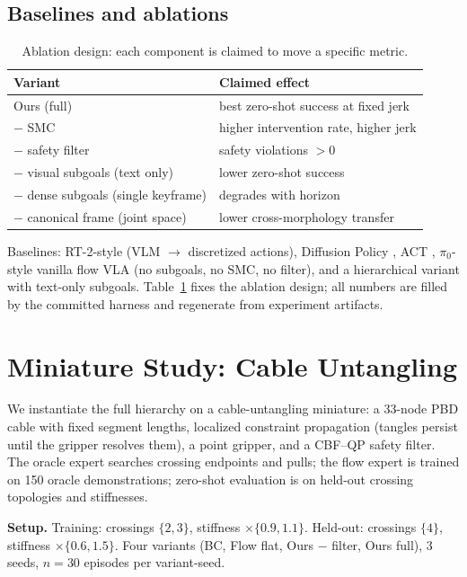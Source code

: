 \documentclass[conference,10pt]{IEEEtran}
\begin{document}
\subsection{Baselines and ablations}
\begin{table}[t]
\centering
\caption{Ablation design: each component is claimed to move a specific metric.}
\label{tab:abl}
\begin{tabular}{@{}ll@{}}
\toprule
Variant & Claimed effect \\
\midrule
Ours (full) & best zero-shot success at fixed jerk \\
$-$ SMC & higher intervention rate, higher jerk \\
$-$ safety filter & safety violations $> 0$ \\
$-$ visual subgoals (text only) & lower zero-shot success \\
$-$ dense subgoals (single keyframe) & degrades with horizon \\
$-$ canonical frame (joint space) & lower cross-morphology transfer \\
\bottomrule
\end{tabular}
\end{table}
Baselines: RT-2-style (VLM $\to$ discretized actions), Diffusion Policy \cite{diffusionpolicy}, ACT \cite{act}, $\pi_0$-style vanilla flow VLA (no subgoals, no SMC, no filter), and a hierarchical variant with text-only subgoals. Table~\ref{tab:abl} fixes the ablation design; all numbers are filled by the committed harness and regenerate from experiment artifacts.

\section{Miniature Study: Cable Untangling}
\label{sec:results}
We instantiate the full hierarchy on a cable-untangling miniature: a 33-node PBD cable with fixed segment lengths, localized constraint propagation (tangles persist until the gripper resolves them), a point gripper, and a CBF--QP safety filter. The oracle expert searches crossing endpoints and pulls; the flow expert is trained on 150 oracle demonstrations; zero-shot evaluation is on held-out crossing topologies and stiffnesses.

\textbf{Setup.} Training: crossings $\{2,3\}$, stiffness $\times\{0.9, 1.1\}$. Held-out: crossings $\{4\}$, stiffness $\times\{0.6, 1.5\}$. Four variants (BC, Flow flat, Ours $-$ filter, Ours full), 3 seeds, $n=30$ episodes per variant-seed.
\end{document}
